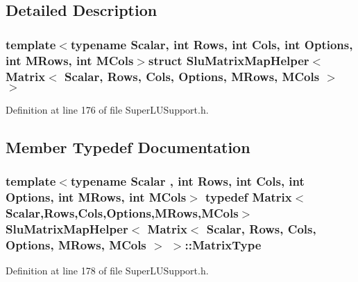 \subsection{Detailed Description}
\subsubsection*{template$<$typename Scalar, int Rows, int Cols, int Options, int M\-Rows, int M\-Cols$>$struct Slu\-Matrix\-Map\-Helper$<$ Matrix$<$ Scalar, Rows, Cols, Options, M\-Rows, M\-Cols $>$ $>$}



Definition at line 176 of file Super\-L\-U\-Support.\-h.



\subsection{Member Typedef Documentation}
\hypertarget{struct_slu_matrix_map_helper_3_01_matrix_3_01_scalar_00_01_rows_00_01_cols_00_01_options_00_01_m_rows_00_01_m_cols_01_4_01_4_a7ca362900dab58b2714e39a32fe686d5}{
\subsubsection[{Matrix\-Type}]{\setlength{\rightskip}{0pt plus 5cm}template$<$typename Scalar , int Rows, int Cols, int Options, int M\-Rows, int M\-Cols$>$ typedef {\bf Matrix}$<$Scalar,Rows,Cols,Options,M\-Rows,M\-Cols$>$ {\bf Slu\-Matrix\-Map\-Helper}$<$ {\bf Matrix}$<$ Scalar, Rows, Cols, Options, M\-Rows, M\-Cols $>$ $>$\-::{\bf Matrix\-Type}}}\label{struct_slu_matrix_map_helper_3_01_matrix_3_01_scalar_00_01_rows_00_01_cols_00_01_options_00_01_m_rows_00_01_m_cols_01_4_01_4_a7ca362900dab58b2714e39a32fe686d5}


Definition at line 178 of file Super\-L\-U\-Support.\-h.



